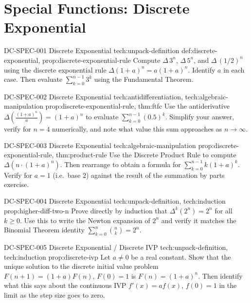 \section*{Special Functions: Discrete Exponential}

\exstubgenfull
  {DC-SPEC-001}
  {Discrete Exponential}
  {tech:unpack-definition}
  {def:discrete-exponential, prop:discrete-exponential-rule}
  {Compute \(\Delta\,3^n\), \(\Delta\,5^n\), and \(\Delta\,(1/2)^n\)
  using the discrete exponential rule \(\Delta(1+a)^n = a(1+a)^n\).
  Identify \(a\) in each case. Then evaluate
  \(\displaystyle\sum_{k=0}^{n-1} 3^k\) using the Fundamental Theorem.}

\exstubgenfull
  {DC-SPEC-002}
  {Discrete Exponential}
  {tech:antidifferentiation, tech:algebraic-manipulation}
  {prop:discrete-exponential-rule, thm:ftfc}
  {Use the antiderivative \(\Delta\!\left(\tfrac{(1+a)^n}{a}\right) = (1+a)^n\)
  to evaluate \(\displaystyle\sum_{k=0}^{n-1}(0.5)^k\). Simplify your
  answer, verify for \(n = 4\) numerically, and note what value this
  sum approaches as \(n \to \infty\).}

\exstubgenfull
  {DC-SPEC-003}
  {Discrete Exponential}
  {tech:algebraic-manipulation}
  {prop:discrete-exponential-rule, thm:product-rule}
  {Use the Discrete Product Rule to compute \(\Delta(n \cdot (1+a)^n)\).
  Then rearrange to obtain a formula for
  \(\displaystyle\sum_{k=0}^{n-1} k(1+a)^k\).
  Verify for \(a = 1\) (i.e.\ base \(2\)) against the result of
  the summation by parts exercise.}

\exstubgenfull
  {DC-SPEC-004}
  {Discrete Exponential}
  {tech:unpack-definition, tech:induction}
  {prop:higher-diff-two-n}
  {Prove directly by induction that \(\Delta^k(2^n) = 2^n\) for all
  \(k \ge 0\). Use this to write the Newton expansion of \(2^n\)
  and verify it matches the Binomial Theorem identity
  \(\sum_{k=0}^{n}\binom{n}{k} = 2^n\).}

\exstubgenfull
  {DC-SPEC-005}
  {Discrete Exponential / Discrete IVP}
  {tech:unpack-definition, tech:induction}
  {prop:discrete-ivp}
  {Let \(a \ne 0\) be a real constant. Show that the unique solution to
  the discrete initial value problem
  \(F(n+1) = (1+a)F(n)\), \(F(0) = 1\)
  is \(F(n) = (1+a)^n\). Then identify what this says about the
  continuous IVP \(f'(x) = af(x)\), \(f(0) = 1\) in the limit
  as the step size goes to zero.}

